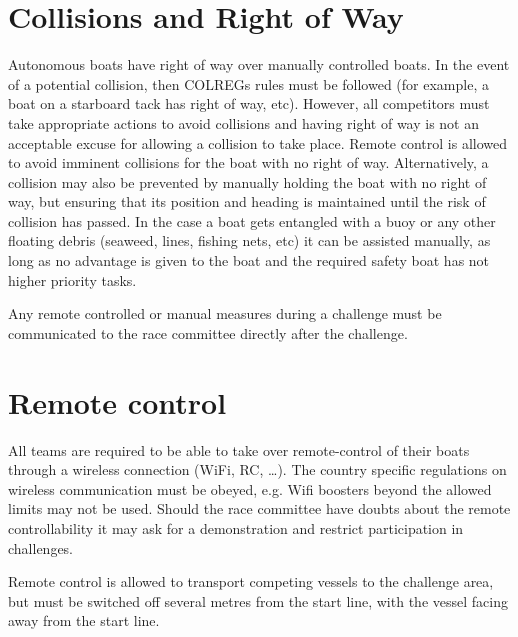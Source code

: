 \documentclass[12pt]{article}
\begin{document}
\section{Collisions and Right of Way}
Autonomous boats have right of way over manually controlled boats. In the event
of a potential
collision, then COLREGs rules must be followed (for example, a boat on a
starboard tack has
right of way, etc). However, all competitors must take appropriate actions to
avoid collisions
and having right of way is not an acceptable excuse for allowing a collision to
take place.
Remote control is allowed to avoid imminent collisions for the boat with no 
right of way. Alternatively, a collision may also be
prevented by manually holding the boat with no right of way, but ensuring that 
its position and heading is maintained until the risk of collision has passed. 
In the case a boat gets entangled with a buoy or any other
floating debris (seaweed, lines, fishing nets, etc) it can be assisted manually,
as long as no advantage is given to the boat and the required safety boat has
not higher priority tasks.

Any remote controlled or manual measures during a challenge must be
communicated to the race committee directly after the challenge.

\section{Remote control}
All teams are required to be able to take over remote-control of their boats
through a wireless connection (WiFi, RC, \ldots). The country specific 
regulations on wireless communication must be obeyed, e.g. Wifi boosters beyond
the allowed limits may not be used.
Should the race committee have doubts about the remote controllability it may
ask for a demonstration and restrict participation in challenges.

Remote control is allowed to transport competing vessels to the challenge area,
but must be switched off several metres from the start line, with the vessel
facing away from the start line.
\end{document}
